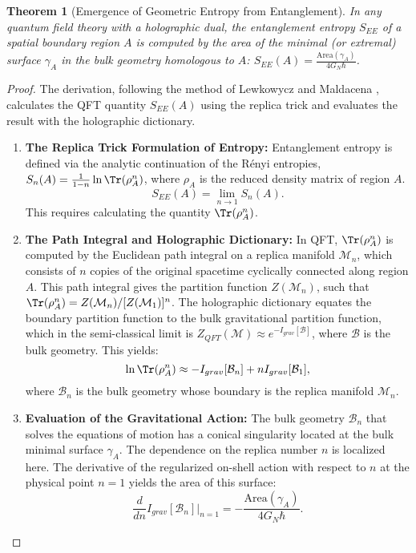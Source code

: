 \documentclass[11pt, letterpaper]{report}
\theoremstyle{plain} %
\newtheorem{theorem}{Theorem}[chapter]
\theoremstyle{definition} %
\theoremstyle{remark} %
\begin{document}
\begin{theorem}[Emergence of Geometric Entropy from Entanglement]
\label{thm:geometric_from_entanglement_final_c7}
In any quantum field theory with a holographic dual, the entanglement entropy $S_{EE}$ of a spatial boundary region $A$ is computed by the area of the minimal (or extremal) surface $\gamma_A$ in the bulk geometry homologous to $A$: $S_{EE}(A) = \frac{\text{Area}(\gamma_A)}{4G_N\hbar}$.
\end{theorem}
\begin{proof}
The derivation, following the method of Lewkowycz and Maldacena \cite{Lewkowycz2013}, calculates the QFT quantity $S_{EE}(A)$ using the replica trick and evaluates the result with the holographic dictionary.
\begin{enumerate}
    \item \textbf{The Replica Trick Formulation of Entropy:} Entanglement entropy is defined via the analytic continuation of the Rényi entropies, $S_n(A) = \frac{1}{1-n} \ln \Tr(\rho_A^n)$, where $\rho_A$ is the reduced density matrix of region $A$.
    \begin{equation}
        S_{EE}(A) = \lim_{n \to 1} S_n(A).
    \end{equation}
    This requires calculating the quantity $\Tr(\rho_A^n)$.

    \item \textbf{The Path Integral and Holographic Dictionary:} In QFT, $\Tr(\rho_A^n)$ is computed by the Euclidean path integral on a replica manifold $\mathcal{M}_n$, which consists of $n$ copies of the original spacetime cyclically connected along region $A$. This path integral gives the partition function $Z(\mathcal{M}_n)$, such that $\Tr(\rho_A^n) = Z(\mathcal{M}_n)/[Z(\mathcal{M}_1)]^n$. The holographic dictionary equates the boundary partition function to the bulk gravitational partition function, which in the semi-classical limit is $Z_{QFT}(\mathcal{M}) \approx e^{-I_{grav}[\mathcal{B}]}$, where $\mathcal{B}$ is the bulk geometry. This yields:
    \begin{equation}
        \ln \Tr(\rho_A^n) \approx -I_{grav}[\mathcal{B}_n] + n I_{grav}[\mathcal{B}_1],
    \end{equation}
    where $\mathcal{B}_n$ is the bulk geometry whose boundary is the replica manifold $\mathcal{M}_n$.

    \item \textbf{Evaluation of the Gravitational Action:} The bulk geometry $\mathcal{B}_n$ that solves the equations of motion has a conical singularity located at the bulk minimal surface $\gamma_A$. The dependence on the replica number $n$ is localized here. The derivative of the regularized on-shell action with respect to $n$ at the physical point $n=1$ yields the area of this surface:
    \begin{equation}
        \frac{d}{dn} I_{grav}[\mathcal{B}_n] \bigg|_{n=1} = -\frac{\text{Area}(\gamma_A)}{4G_N\hbar}.
    \end{equation}


\end{enumerate}
\end{proof}
\end{document}
